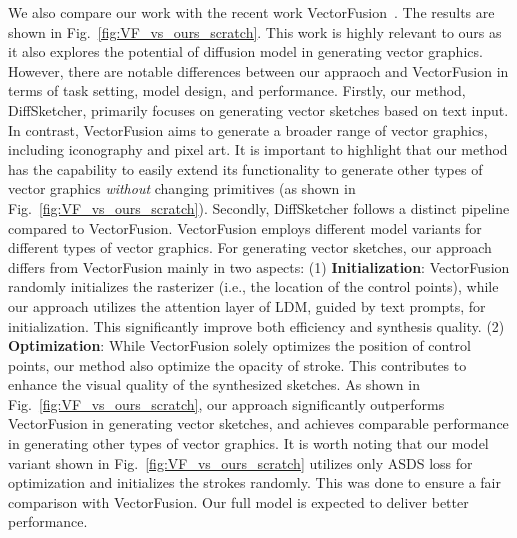 \documentclass{article}
\begin{document}
We also compare our work with the recent work VectorFusion~\cite{jain2022vectorfusion}. The results are shown in Fig.~\ref{fig:VF_vs_ours_scratch}. This work is highly relevant to ours as it also explores the potential of diffusion model in generating vector graphics. However, there are notable differences between our appraoch and VectorFusion in terms of task setting, model design, and performance. Firstly, our method, DiffSketcher, primarily focuses on generating vector sketches based on text input. In contrast, VectorFusion aims to generate a broader range of vector graphics, including iconography and pixel art. It is important to highlight that our method has the capability to easily extend its functionality to generate other types of vector graphics \textit{without} changing primitives (as shown in Fig.~\ref{fig:VF_vs_ours_scratch}).
Secondly, DiffSketcher follows a distinct pipeline compared to VectorFusion. VectorFusion employs different model variants for different types of vector graphics. For generating vector sketches, our approach differs from VectorFusion mainly in two aspects: (1) \textbf{Initialization}: VectorFusion randomly initializes the rasterizer (i.e., the location of the control points), while our approach utilizes the attention layer of LDM, guided by text prompts, for initialization. This significantly improve both efficiency and synthesis quality. (2) \textbf{Optimization}: While VectorFusion solely optimizes the position of control points, our method also optimize the opacity of stroke. This contributes to enhance the visual quality of the synthesized sketches. As shown in Fig.~\ref{fig:VF_vs_ours_scratch}, our approach significantly outperforms VectorFusion in generating vector sketches, and achieves comparable performance in generating other types of vector graphics. It is worth noting that our model variant shown in Fig.~\ref{fig:VF_vs_ours_scratch} utilizes only ASDS loss for optimization and initializes the strokes randomly. This was done to ensure a fair comparison with VectorFusion. Our full model is expected to deliver better performance.
\end{document}
